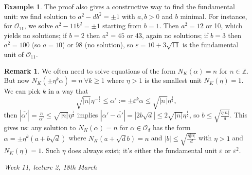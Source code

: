 \documentclass{article}
\newcommand{\Z}{\mathbb{Z}}
\newcommand{\ri}{\mathcal{O}}
\theoremstyle{definition}
\newtheorem{example}[defn]{Example}
\newtheorem{remark}[defn]{Remark}
\begin{document}
\begin{example}
The proof also gives a constructive way to find the fundamental unit: we find solution to $a^2-db^2=\pm 1$ with $a,b>0$ and $b$ minimal. For instance, for $\ri_{11}$, we solve $a^2-11b^2=\pm 1$ starting from $b=1$. Then $a^2=12$ or 10, which yields no solutions; if $b=2$ then $a^2=45$ or 43, again no solutions; if $b=3$ then $a^2=100$ (so $a=10$) or 98 (no solution), so $\varepsilon=10+3\sqrt{11}$ is the fundamental unit of $\ri_{11}$.
\end{example}

\begin{remark}
\label{remark:solveNKaisn}
We often need to solve equations of the form $N_K(\alpha)=n$ for $n\in\Z$. But now $N_K\left(\pm\eta^k\alpha\right)=n \ \forall k\geq 1$ where $\eta>1$ is the smallest unit $N_K(\eta)=1$. We can pick $k$ in a way that
\[
\sqrt{|n|}\eta^{-\frac12}\leq\alpha':=\pm\varepsilon^k\alpha\leq\sqrt{|n|}\eta^\frac12,
\]
then $|\overline{\alpha'}|=\frac{n}{\alpha'}\leq\sqrt{|n|}\eta^\frac12$ implies $|\alpha'-\overline{\alpha'}|=|2b\sqrt d|\leq 2\sqrt{|n|}\eta^\frac12$, so $b\leq\sqrt{\frac{\eta|n|}{d}}$. This gives us: any solution to $N_K(\alpha)=n$ for $\alpha\in\ri_d$ has the form $\alpha=\pm\eta^k\left(a+b\sqrt d\right)$ where $N_K\left(a+\sqrt db\right)=n$ and $|b|\leq\sqrt{\frac{\eta|n|}{d}}$ with $\eta>1$ and $N_K(\eta)=1$. Such $\eta$ does always exist; it's either the fundamental unit $\varepsilon$ or $\varepsilon^2$.
\end{remark}

\begin{flushright}
\textit{Week 11, lecture 2, 18th March}
\end{flushright}
\end{document}
